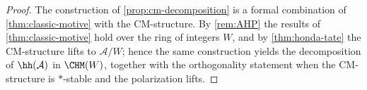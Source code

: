 \begin{proof}
  The construction of \cref{prop:cm-decomposition} is a formal combination of
  \cref{thm:classic-motive} with the CM-structure. By \cref{rem:AHP} the results
  of \cref{thm:classic-motive} hold over the ring of integers \(W\), and by
  \cref{thm:honda-tate} the CM-structure lifts to \(\mathcal{A}/W\); hence the
  same construction yields the decomposition of \(\hh(\mathcal{A})\) in
  \(\CHM(W)\), together with the orthogonality statement when the CM-structure is
  \(*\)-stable and the polarization lifts.
\end{proof}
